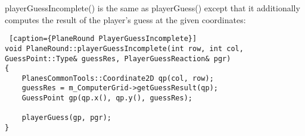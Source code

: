 playerGuessIncomplete() is the same as playerGuess() except that it additionally  computes the result of the player's guess at the given coordinates:

\begin {lstlisting} [caption={PlaneRound PlayerGuessIncomplete}]
void PlaneRound::playerGuessIncomplete(int row, int col, GuessPoint::Type& guessRes, PlayerGuessReaction& pgr)
{
	PlanesCommonTools::Coordinate2D qp(col, row);
	guessRes = m_ComputerGrid->getGuessResult(qp);
	GuessPoint gp(qp.x(), qp.y(), guessRes);
	
	playerGuess(gp, pgr);
}
\end{lstlisting}


